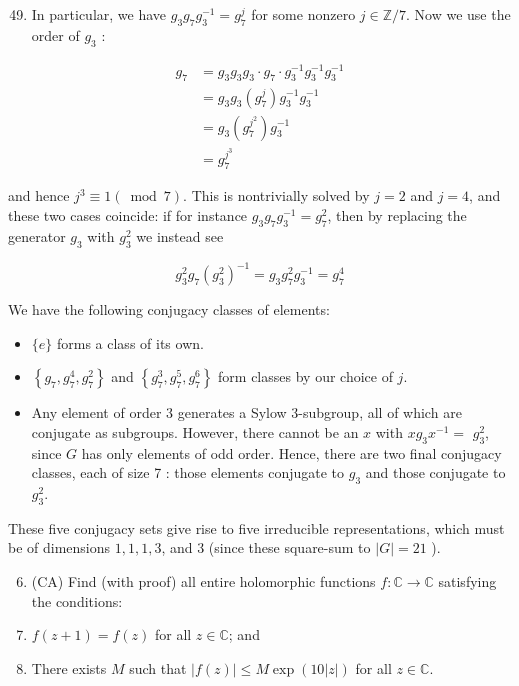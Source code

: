 \documentclass[10pt]{article}
\begin{document}
\begin{enumerate}
  \setcounter{enumi}{48}
  \item In particular, we have $g_{3} g_{7} g_{3}^{-1}=g_{7}^{j}$ for some nonzero $j \in \mathbb{Z} / 7$. Now we use the order of $g_{3}$ :
\end{enumerate}

$$
\begin{aligned}
g_{7} & =g_{3} g_{3} g_{3} \cdot g_{7} \cdot g_{3}^{-1} g_{3}^{-1} g_{3}^{-1} \\
& =g_{3} g_{3}\left(g_{7}^{j}\right) g_{3}^{-1} g_{3}^{-1} \\
& =g_{3}\left(g_{7}^{j^{2}}\right) g_{3}^{-1} \\
& =g_{7}^{j^{3}}
\end{aligned}
$$

and hence $j^{3} \equiv 1(\bmod 7)$. This is nontrivially solved by $j=2$ and $j=4$, and these two cases coincide: if for instance $g_{3} g_{7} g_{3}^{-1}=g_{7}^{2}$, then by replacing the generator $g_{3}$ with $g_{3}^{2}$ we instead see

$$
g_{3}^{2} g_{7}\left(g_{3}^{2}\right)^{-1}=g_{3} g_{7}^{2} g_{3}^{-1}=g_{7}^{4}
$$

We have the following conjugacy classes of elements:

\begin{itemize}
  \item $\{e\}$ forms a class of its own.

  \item $\left\{g_{7}, g_{7}^{4}, g_{7}^{2}\right\}$ and $\left\{g_{7}^{3}, g_{7}^{5}, g_{7}^{6}\right\}$ form classes by our choice of $j$.

  \item Any element of order 3 generates a Sylow 3-subgroup, all of which are conjugate as subgroups. However, there cannot be an $x$ with $x g_{3} x^{-1}=$ $g_{3}^{2}$, since $G$ has only elements of odd order. Hence, there are two final conjugacy classes, each of size 7 : those elements conjugate to $g_{3}$ and those conjugate to $g_{3}^{2}$.

\end{itemize}

These five conjugacy sets give rise to five irreducible representations, which must be of dimensions $1,1,1,3$, and 3 (since these square-sum to $|G|=21$ ).

\begin{enumerate}
  \setcounter{enumi}{5}
  \item (CA) Find (with proof) all entire holomorphic functions $f: \mathbb{C} \rightarrow \mathbb{C}$ satisfying the conditions:

  \item $f(z+1)=f(z)$ for all $z \in \mathbb{C}$; and

  \item There exists $M$ such that $|f(z)| \leq M \exp (10|z|)$ for all $z \in \mathbb{C}$.

\end{enumerate}
\end{document}
